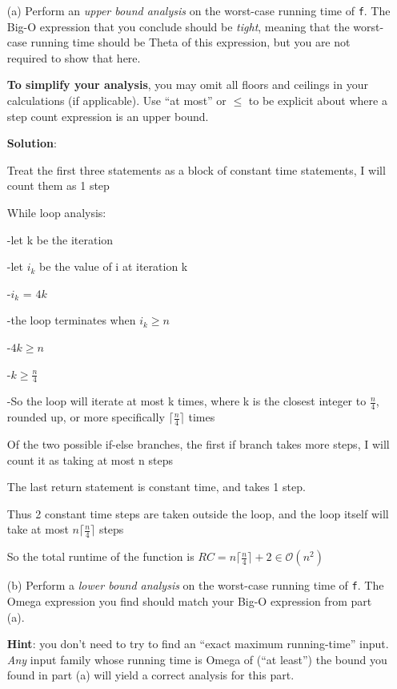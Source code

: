 \documentclass{article}
\newcommand{\cO}{\mathcal{O}}
\begin{document}
\begin{enumerate}

\item[(a)]
Perform an \emph{upper bound analysis} on the worst-case running time of \texttt{f}.
The Big-O expression that you conclude should be \emph{tight}, meaning that the worst-case running time should be Theta of this expression, but you are not required to show that here.

\textbf{To simplify your analysis}, you may omit all floors and ceilings in your calculations (if applicable).
Use ``at most'' or $\leq$ to be explicit about where a step count expression is an upper bound.

\textbf{Solution}:

Treat the first three statements as a block of constant time statements, I will count them as 1 step

While loop analysis:

-let k be the iteration

-let $i_k$ be the value of i at iteration k

-$i_k$ = $4k$

-the loop terminates when $i_k \geq n$

-$4k \geq n$

-$k \geq \frac{n}{4}$

-So the loop will iterate at most k times, where k is the closest integer to $\frac{n}{4}$, rounded up, or more specifically $\lceil \frac{n}{4} \rceil$ times

Of the two possible if-else branches, the first if branch takes more steps, I will count it as taking at most n steps

The last return statement is constant time, and takes 1 step.

Thus 2 constant time steps are taken outside the loop, and the loop itself will take at most $n \lceil \frac{n}{4} \rceil$ steps

So the total runtime of the function is $RC = n \lceil \frac{n}{4} \rceil + 2 \in \cO (n^2)$


\item[(b)]
Perform a \emph{lower bound analysis} on the worst-case running time of \texttt{f}.
The Omega expression you find should match your Big-O expression from part (a).

\textbf{Hint}: you don't need to try to find an ``exact maximum running-time'' input. \emph{Any} input family whose running time is Omega of (``at least'') the bound you found in part (a) will yield a correct analysis for this part.


\end{enumerate}
\end{document}
